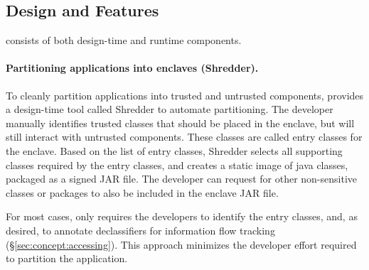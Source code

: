 \subsection{Design and Features}

\systemname{} consists of both design-time and runtime components.  

\paragraph{Partitioning \java{} applications into enclaves (Shredder).}
To cleanly partition \java{} applications into
 trusted and untrusted components,
\systemname{} provides a design-time tool called Shredder
to automate partitioning.
The developer manually identifies trusted classes that should be placed in the enclave,
but will still interact with untrusted components.
These classes are called entry classes for the enclave.
Based on the list of entry classes, 
Shredder selects all supporting classes required by the entry classes,
and creates a static image of java classes, packaged as a signed JAR file.
The developer can request for other non-sensitive classes or packages to also be included in the enclave JAR file.


For most cases, \systemname{} only requires the developers
to identify the entry classes, and, as desired, to annotate declassifiers for information flow tracking (\S\ref{sec:concept:accessing}).
This approach minimizes the developer effort required to partition the application.


